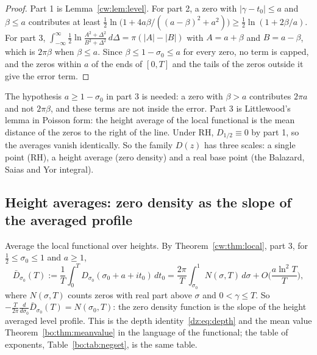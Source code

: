 \begin{proof}
Part 1 is Lemma~\ref{cw:lem:level}. For part 2, a zero with $|\gamma-t_0|\le a$ and $\beta\le a$ contributes at least $\frac12\ln\big(1+4a\beta/((a-\beta)^2+a^2)\big)\ge\frac12\ln(1+2\beta/a)$. For part 3, $\int_{-\infty}^\infty\frac12\ln\frac{A^2+\Delta^2}{B^2+\Delta^2}\,d\Delta=\pi(|A|-|B|)$ with $A=a+\beta$ and $B=a-\beta$, which is $2\pi\beta$ when $\beta\le a$. Since $\beta\le1-\sigma_0\le a$ for every zero, no term is capped, and the zeros within $a$ of the ends of $[0,T]$ and the tails of the zeros outside it give the error term.
\end{proof}

The hypothesis $a\ge1-\sigma_0$ in part 3 is needed: a zero with $\beta>a$ contributes $2\pi a$ and not $2\pi\beta$, and these terms are not inside the error. Part 3 is Littlewood's lemma in Poisson form: the height average of the local functional is the mean distance of the zeros to the right of the line. Under RH, $D_{1/2}\equiv0$ by part 1, so the averages vanish identically. So the family $D(z)$ has three scales: a single point (RH), a height average (zero density) and a real base point (the Balazard, Saias and Yor integral).

\subsection{Height averages: zero density as the slope of the averaged profile}\label{cw:sec:avg}
Average the local functional over heights. By Theorem~\ref{cw:thm:local}, part 3, for $\frac12\le\sigma_0\le1$ and $a\ge1$,
\begin{equation}\label{cw:eq:avg}
\bar D_{\sigma_0}(T):=\frac1T\int_0^TD_{\sigma_0}(\sigma_0+a+it_0)\,dt_0=\frac{2\pi}T\int_{\sigma_0}^1N(\sigma,T)\,d\sigma+O\Big(\frac{a\ln^2T}T\Big),
\end{equation}
where $N(\sigma,T)$ counts zeros with real part above $\sigma$ and $0<\gamma\le T$. So $-\frac T{2\pi}\frac d{d\sigma_0}\bar D_{\sigma_0}(T)=N(\sigma_0,T)$: the zero density function is the slope of the height averaged level profile. This is the depth identity~\eqref{dz:eq:depth} and the mean value Theorem~\ref{bo:thm:meanvalue} in the language of the functional; the table of exponents, Table~\ref{bo:tab:negset}, is the same table.

